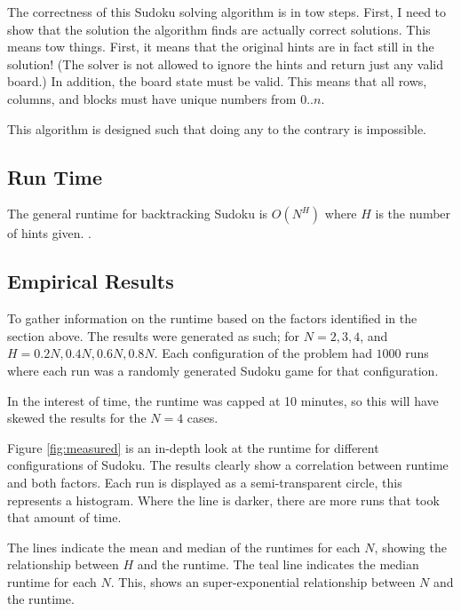 \documentclass{sig-alternate-05-2015}
\begin{document}
The correctness of this Sudoku solving algorithm is in tow steps. %
First, I need to show that the solution the algorithm finds are actually
correct solutions. This means tow things. First, it means that the original
hints are in fact still in the solution! (The solver is not allowed to ignore
the hints and return just any valid board.) In addition, the board state must
be valid. This means that all rows, columns, and blocks must have unique
numbers from $0..n$.

This algorithm is designed such that doing any to the contrary is impossible.

\subsection{Run Time}

The general runtime for backtracking Sudoku is $O(N^H)$ where $H$ is the number
of hints given. \citationneeded.

\subsection{Empirical Results}

To gather information on the runtime based on the factors identified in the section
above. The results were generated as such; for $N=2,3,4$, and $H=0.2N,0.4N,0.6N,0.8N$.
Each configuration of the problem had $1000$ runs where each run was a randomly
generated Sudoku game for that configuration.

In the interest of time, the runtime was capped at 10 minutes, so this will have
skewed the results for the $N=4$ cases.

\begin{figure*}
    \begin{center}
        \resizebox{\textwidth}{!}{%
        }
        \caption{Measured Results}
        \label{fig:measured}
    \end{center}
\end{figure*}

Figure \ref{fig:measured} is an in-depth look at the runtime for different configurations of
Sudoku. The results clearly show a correlation between runtime and both factors. Each run
is displayed as a semi-transparent circle, this represents a histogram. Where the line is darker,
there are more runs that took that amount of time.


The lines indicate the mean and median of the runtimes for each $N$, showing the relationship
between $H$ and the runtime. The teal line indicates the median runtime for each $N$. This, shows
an super-exponential relationship between $N$ and the runtime.
\end{document}
